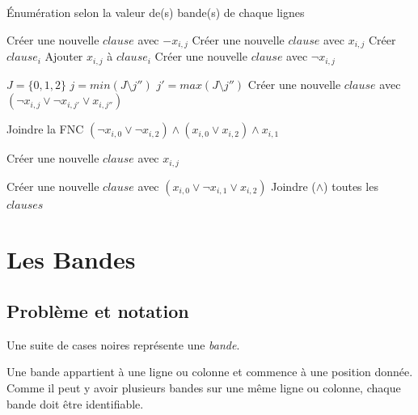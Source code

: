 \documentclass[a4paper,12pt]{report}
\begin{document}
\begin{algorithm}
\caption{Énumération selon la valeur de(s) bande(s) de chaque lignes}
\begin{algorithmic}
		 
				\State Créer une nouvelle $clause$ avec $-x_{i,j}$
				\State Créer une nouvelle $clause$ avec $x_{i,j}$
			\EndIf
		\EndFor
		 
				\State Créer $clause_i$
			\EndIf
			\State Ajouter $x_{i,j}$ à $clause_i$ 
		\EndFor
			 
					\State	Créer une nouvelle $clause$ avec $\lnot x_{i,j} $
				\EndFor
	
			 
			\State $J=\{0,1,2\}$
					\State $j=min(J\setminus j'')$
					\State $j'=max(J\setminus j'')$ 
					\State Créer une nouvelle $clause$ avec $(\lnot x_{i,j}\vee \lnot x_{i,j'} \vee x_{i,j''} )$ 
				\EndFor
							
			 
				\State Joindre la FNC $(\lnot x_{i,0} \vee \lnot x_{i,2}) \wedge (x_{i,0} \vee x_{i,2}) \wedge x_{i,1}$
							
			 
							\State Créer une nouvelle $clause$ avec $x_{i,j}$
				\EndFor
							
			\EndIf
			\State Créer une nouvelle $clause$ avec $(x_{i,0} \vee \lnot x_{i,1} \vee x_{i,2})$
		\EndIf			 
		\State Joindre ($\wedge$) toutes les $clauses$
\EndFor
\end{algorithmic}
\end{algorithm}


\chapter{Les Bandes}
\section{Problème et notation}

Une suite de cases noires représente une \textit{bande}. 

Une bande appartient à une ligne ou colonne et commence à une position donnée. Comme il peut y avoir plusieurs bandes sur une même ligne ou colonne, chaque bande doit être identifiable.\\
\end{document}
